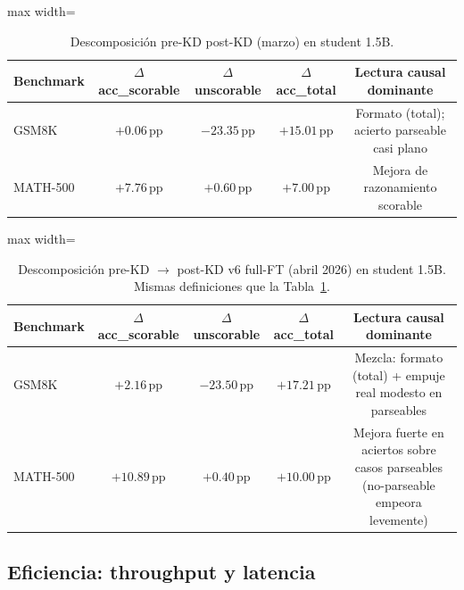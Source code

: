 \documentclass[11pt,a4paper]{article}
\begin{document}
\begin{table}[H]
\centering
\caption{Descomposici\'on pre-KD \to post-KD (marzo) en student 1.5B.}
\label{tab:causal-1p5b}
\begin{adjustbox}{max width=\textwidth}
\begin{tabular}{lcccc}
\toprule
\textbf{Benchmark} & \textbf{$\Delta$ acc\_scorable} & \textbf{$\Delta$ unscorable} & \textbf{$\Delta$ acc\_total} & \textbf{Lectura causal dominante} \\
\midrule
GSM8K    & $+0.06$\,pp & $-23.35$\,pp & $+15.01$\,pp & Formato (total); acierto parseable casi plano \\
MATH-500 & $+7.76$\,pp  & $+0.60$\,pp  & $+7.00$\,pp & Mejora de razonamiento scorable \\
\bottomrule
\end{tabular}
\end{adjustbox}
\end{table}

\begin{table}[H]
\centering
\caption{Descomposici\'on pre-KD $\to$ post-KD v6 full-FT (abril 2026) en student 1.5B.
         Mismas definiciones que la Tabla~\ref{tab:causal-1p5b}.}
\label{tab:causal-1p5b-v6}
\begin{adjustbox}{max width=\textwidth}
\begin{tabular}{lcccc}
\toprule
\textbf{Benchmark} & \textbf{$\Delta$ acc\_scorable} & \textbf{$\Delta$ unscorable} & \textbf{$\Delta$ acc\_total} & \textbf{Lectura causal dominante} \\
\midrule
GSM8K    & $+2.16$\,pp & $-23.50$\,pp & $+17.21$\,pp & Mezcla: formato (total) + empuje real modesto en parseables \\
MATH-500 & $+10.89$\,pp & $+0.40$\,pp  & $+10.00$\,pp & Mejora fuerte en aciertos sobre casos parseables (no-parseable empeora levemente) \\
\bottomrule
\end{tabular}
\end{adjustbox}
\end{table}

\subsection{Eficiencia: throughput y latencia}
\end{document}
